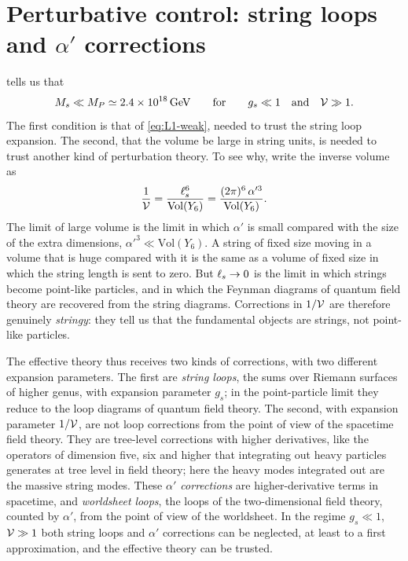 \section{Perturbative control: string loops and \texorpdfstring{$\alpha'$}{alpha'} corrections}
\label{sec:L1-control}

 tells us that
\begin{equation}
  M_{s} \ll M_{P} \simeq 2.4\times10^{18}\,\mathrm{GeV}
  \qquad\text{for}\qquad g_s \ll 1 \quad\text{and}\quad \mathcal{V} \gg 1 .
  \label{eq:L1-hierarchy-conditions}
\end{equation}
The first condition is that of \cref{eq:L1-weak}, needed to trust the string loop expansion. The second, that the volume be large in string units, is needed to trust another kind of perturbation theory. To see why, write the inverse volume as
\begin{equation}
  \frac{1}{\mathcal{V}} = \frac{\ell_s^6}{\mathrm{Vol}(Y_6)} = \frac{(2\pi)^6\,\alpha'^3}{\mathrm{Vol}(Y_6)} .
  \label{eq:L1-invV}
\end{equation}
The limit of large volume is the limit in which $\alpha'$ is small compared with the size of the extra dimensions, $\alpha'^3\ll\mathrm{Vol}(Y_6)$.
A string of fixed size moving in a volume that is huge compared with it is the same as a volume of fixed size in which the string length is sent to zero. But $\ell_s\to0$ is the limit in which strings become point-like particles, and in which the Feynman diagrams of quantum field theory are recovered from the string diagrams. Corrections in $1/\mathcal{V}$ are therefore genuinely \emph{stringy}: they tell us that the fundamental objects are strings, not point-like particles.

The effective theory thus receives two kinds of corrections, with two different expansion parameters. The first are \emph{string loops}, the sums over Riemann surfaces of higher genus, with expansion parameter $g_s$; in the point-particle limit they reduce to the loop diagrams of quantum field theory. The second, with expansion parameter $1/\mathcal{V}$, are not loop corrections from the point of view of the spacetime field theory. They are tree-level corrections with higher derivatives, like the operators of dimension five, six and higher that integrating out heavy particles generates at tree level in field theory; here the heavy modes integrated out are the massive string modes. These \emph{$\alpha'$ corrections} are higher-derivative terms in spacetime, and \emph{worldsheet loops}, the loops of the two-dimensional field theory, counted by $\alpha'$, from the point of view of the worldsheet. In the regime $g_s\ll1$, $\mathcal{V}\gg1$ both string loops and $\alpha'$ corrections can be neglected, at least to a first approximation, and the effective theory can be trusted.

